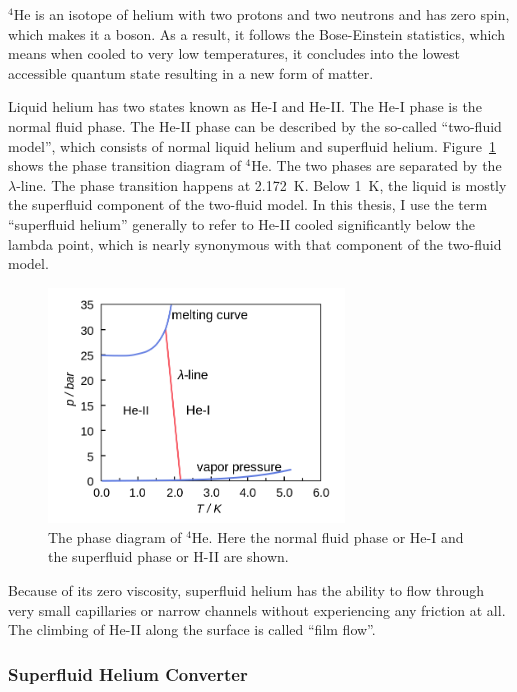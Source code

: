$^4$He is an isotope of helium with two protons and two neutrons and
has zero spin, which makes it a boson. As a result, it follows the
Bose-Einstein statistics, which means when cooled to very low
temperatures, it concludes into the lowest accessible quantum state
resulting in a new form of matter.

Liquid helium has two states known as He-I and He-II. The He-I phase
is the normal fluid phase. The He-II phase can be described by the
so-called ``two-fluid model'', which consists of normal liquid helium
and superfluid helium.
Figure~\ref{fig:phasetransition} shows the phase transition diagram of
$^4$He. The two phases are separated by the $\lambda$-line. The phase
transition happens at 2.172~K. Below 1~K, the liquid is mostly the
superfluid component of the two-fluid model. In this thesis, I use
the term ``superfluid helium'' generally to refer to He-II cooled
significantly below the lambda point, which is nearly synonymous with
that component of the two-fluid model.

\begin{figure}[h!]
  \centering \includegraphics[width=0.7\textwidth]{phasetransition.png}
  \caption[Phase diagram of $^4$He]{The phase diagram of $^4$He. Here
    the normal fluid phase or He-I and the superfluid phase or H-II
    are shown.}
\label{fig:phasetransition}
\end{figure}

Because of its zero viscosity, superfluid helium has the ability to
flow through very small capillaries or narrow channels without
experiencing any friction at all. The climbing of He-II along the
surface is called ``film flow''.

\subsubsection{Superfluid Helium Converter}

